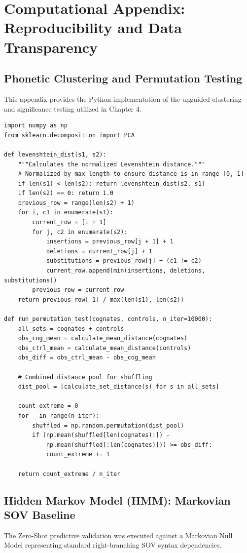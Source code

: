 \chapter{Computational Appendix: Reproducibility and Data Transparency}

\section{Phonetic Clustering and Permutation Testing}
This appendix provides the Python implementation of the unguided clustering and significance testing utilized in Chapter 4. 

\begin{verbatim}
import numpy as np
from sklearn.decomposition import PCA

def levenshtein_dist(s1, s2):
    """Calculates the normalized Levenshtein distance."""
    # Normalized by max length to ensure distance is in range [0, 1]
    if len(s1) < len(s2): return levenshtein_dist(s2, s1)
    if len(s2) == 0: return 1.0
    previous_row = range(len(s2) + 1)
    for i, c1 in enumerate(s1):
        current_row = [i + 1]
        for j, c2 in enumerate(s2):
            insertions = previous_row[j + 1] + 1
            deletions = current_row[j] + 1
            substitutions = previous_row[j] + (c1 != c2)
            current_row.append(min(insertions, deletions, substitutions))
        previous_row = current_row
    return previous_row[-1] / max(len(s1), len(s2))

def run_permutation_test(cognates, controls, n_iter=10000):
    all_sets = cognates + controls
    obs_cog_mean = calculate_mean_distance(cognates)
    obs_ctrl_mean = calculate_mean_distance(controls)
    obs_diff = obs_ctrl_mean - obs_cog_mean
    
    # Combined distance pool for shuffling
    dist_pool = [calculate_set_distance(s) for s in all_sets]
    
    count_extreme = 0
    for _ in range(n_iter):
        shuffled = np.random.permutation(dist_pool)
        if (np.mean(shuffled[len(cognates):]) - 
            np.mean(shuffled[:len(cognates)])) >= obs_diff:
            count_extreme += 1
            
    return count_extreme / n_iter
\end{verbatim}

\section{Hidden Markov Model (HMM): Markovian SOV Baseline}
The Zero-Shot predictive validation was executed against a Markovian Null Model representing standard right-branching SOV syntax dependencies.


